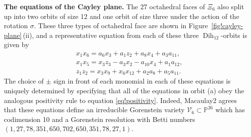 \documentclass[10pt,a4paper]{amsart}
\numberwithin{equation}{section}
\theoremstyle{definition}
\newcommand{\PP}{\mathbb{P}}
\DeclareMathOperator{\Dih}{Dih}
\begin{document}
{\bf The equations of the Cayley plane.}
The 27 octahedral faces of $\Xi_6$ also split up into two orbits of size 12 and one orbit of size three under the action of the rotation $\sigma$. These three types of octahedral face are shown in Figure~\ref{fig!cayley-plane}\,(ii), and a representative equation from each of these three $\Dih_{12}$-orbits is given by
\begin{align*}
&x_1x_6=a_6x_3 + a_1z_2 +a_8x_4+a_3a_{11}, \tag{a} \\
&x_1x_5= x_3z_3 - a_3x_2 - a_{10}x_4 +a_1a_{12}, \tag{b} \\
&z_1z_2= x_3x_9 + x_6x_{12} + a_2a_8 + a_5a_{11}. \tag{c}
\end{align*}
The choice of $\pm$ sign in front of each monomial in each of these equations is uniquely determined by specifying that all of the equations in orbit (a) obey the analogous positivity rule to equation \eqref{eq!positivity}. Indeed, Macaulay2 agrees that these equations define an irreducible Gorenstein variety $\mathcal{V}_6\subset \PP^{26}$ which has codimension 10 and a Gorenstein resolution with Betti numbers~${( 1, 27, 78, 351, 650, 702, 650, 351, 78, 27, 1 )}$.
\end{document}
